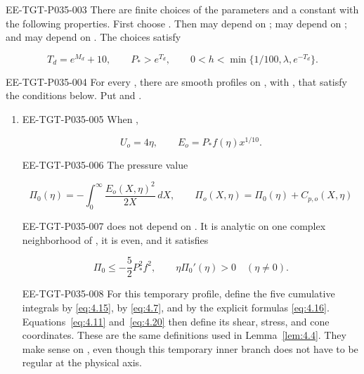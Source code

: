 \begin{lemma}\label{lem:4.8}
\begin{EESegment}{EE-TGT-P035-003}
There are finite choices of the parameters
 and a constant
 with the following properties. First choose
. Then  may depend on
;  may depend on
; and  may depend on
. The choices satisfy
\end{EESegment}
\[
  T_d=e^{M_d}+10,\qquad P_\ast>e^{T_d},\qquad
  0<h<\min\{1/100,\lambda,e^{-T_d}\}.
\]
\begin{EESegment}{EE-TGT-P035-004}
For every , there are smooth profiles
 on
, with
, that satisfy the conditions below. Put
 and
.
\end{EESegment}
\begin{enumerate}[label=(\roman*)]
\item
\begin{EESegment}{EE-TGT-P035-005}
When ,
\end{EESegment}
\[
  U_o=4\eta,\qquad E_o=P_\ast f(\eta)x^{1/10}.
\]
\begin{EESegment}{EE-TGT-P035-006}
The pressure value
\end{EESegment}
\begin{equation}
  \Pi_0(\eta)=-\int_0^\infty\frac{E_o(X,\eta)^2}{2X}\,dX,
  \qquad
  \Pi_o(X,\eta)=\Pi_0(\eta)+C_{p,o}(X,\eta)
  \tag{4.31}\label{eq:4.31}
\end{equation}
\begin{EESegment}{EE-TGT-P035-007}
does not depend on . It is analytic on one complex
neighborhood of , it is even, and it satisfies
\end{EESegment}
\[
  \Pi_0\leq-\frac52P_\ast^2f^2,\qquad \eta\Pi_0'(\eta)>0\quad(\eta\neq0).
\]
\begin{EESegment}{EE-TGT-P035-008}
For this temporary profile, define the five cumulative integrals by
\eqref{eq:4.15},  by \eqref{eq:4.7}, and
 by the explicit formulas
\eqref{eq:4.16}. Equations~\eqref{eq:4.11} and~\eqref{eq:4.20} then define
its shear, stress, and cone coordinates. These are the same definitions used
in Lemma~\ref{lem:4.4}. They make sense on
, even though this temporary inner branch does not
have to be regular at the physical axis.
\end{EESegment}


\end{enumerate}
\end{lemma}
